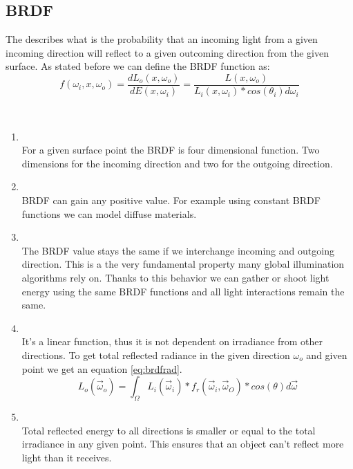 \subsection{BRDF}
The  describes what is the probability that an incoming light from a given incoming direction will reflect to a given outcoming direction from the given surface. As stated before we can define the BRDF function as:
\begin{equation}
f(\omega_{i},x,\omega_{o})=\frac{dL_{o}(x,\omega_{o})}{dE(x,\omega_{i})}=\frac{L(x,\omega_{o})}{L_{i}(x,\omega_{i})*cos(\theta_{i})d\omega_{i}}
\end{equation}

\\
 \begin{enumerate}
\item {}\\
For a given surface point  the BRDF is four dimensional function. Two dimensions for the incoming direction and two for the outgoing direction.

\item {}\\
BRDF can gain any positive value. For example using constant BRDF functions we can model diffuse materials.

\item {}\\
The BRDF value stays the same if we interchange incoming and outgoing direction. This is a the very fundamental property many global illumination algorithms rely on. Thanks to this behavior we can gather or shoot light energy using the same BRDF functions and all light interactions remain the same. 

\item {}\\
It's a linear function, thus it is not dependent on irradiance from other directions. To get total reflected radiance in the given direction $\omega_{o}$ and given point we get an equation \ref{eq:brdfrad}.
 \begin{equation}
L_{o}(\vec\omega_{o})=\int_{\Omega}L_{i}(\vec\omega_{i})*f_{r}(\vec\omega_{i},\vec\omega_{O})*cos(\theta)d\vec\omega
\label{eq:brdfrad} 
\end{equation}

\item {}\\
Total reflected energy to all directions is smaller or equal to the total irradiance in any given point. This ensures that an object can't reflect more light than it receives. 

\end{enumerate}

